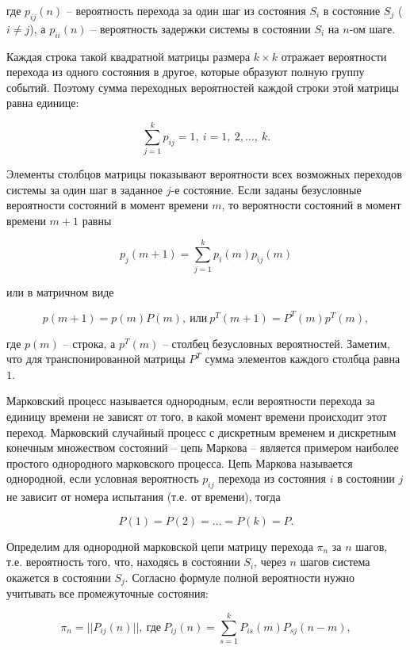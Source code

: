 	где $p_{ij}(n)$ -- вероятность перехода за один шаг из состояния $S_i$ в состояние $S_j$ ($i\neq j$), а $p_{ii}(n)$ -- вероятность задержки системы в состоянии $S_i$ на $n$-ом шаге.
	
	Каждая строка такой квадратной матрицы размера $k\times k$ отражает вероятности перехода из одного состояния в другое, которые образуют полную группу событий. Поэтому сумма переходных вероятностей каждой строки этой матрицы равна единице:
	
	$$
	\sum_{j = 1}^{k}p_{ij} = 1,~i=1,~2,\dots,~k.
	$$
	
	Элементы столбцов матрицы показывают вероятности всех возможных переходов системы за один шаг в заданное $j$-е состояние. Если заданы безусловные вероятности состояний в момент времени $m$, то вероятности состояний в момент времени $m+1$ равны
	
	\begin{equation}\label{eq1}
		p_j(m+1) = \sum_{j = 1}^{k}p_{i}(m)p_{ij}(m)
	\end{equation}
	
	или в матричном виде
	
	$$
	p(m+1)= p(m)P(m),~\text{или}~p^T(m+1)= P^T(m) p^T(m),
	$$
	
	где $p(m)$ -- строка, а $p^T(m)$ -- столбец безусловных вероятностей. Заметим, что для транспонированной матрицы $P^T$ сумма элементов каждого столбца равна $1$.
	
	Марковский процесс называется однородным, если вероятности перехода за единицу времени не зависят от того, в какой момент времени происходит этот переход. Марковский случайный процесс с дискретным временем и дискретным конечным множеством состояний -- цепь Маркова -- является примером наиболее простого однородного марковского процесса. Цепь Маркова называется однородной, если условная вероятность $p_{ij}$ перехода из состояния $i$ в состоянии $j$ не зависит от номера испытания (т.е. от времени), тогда
	
	$$
	P(1)=P(2)=\dots=P(k)= P.
	$$
	
	Определим для однородной марковской цепи матрицу перехода $\pi_n$ за $n$ шагов, т.е. вероятность того, что, находясь в состоянии $S_i$, через $n$ шагов система окажется в состоянии $S_j$. Согласно формуле полной вероятности нужно учитывать все промежуточные состояния:
	
	\begin{equation}\label{eq2}
		\pi_n = \bigg|\bigg|P_{ij}(n)\bigg|\bigg|,~\text{где}~P_{ij}(n) = \sum_{s=1}^{k}P_{is}(m)P_{sj}(n - m),
	\end{equation}
	
